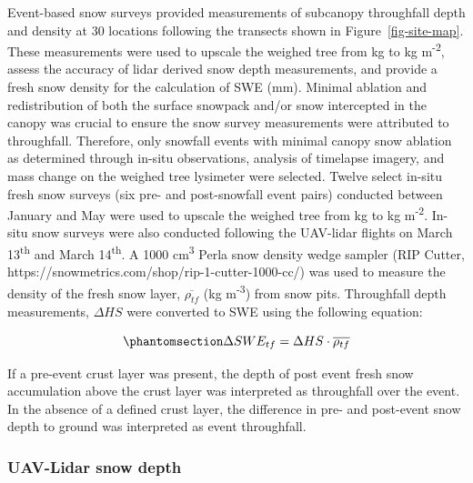 \documentclass[
  letterpaper,
  DIV=11,
  numbers=noendperiod]{scrartcl}
\begin{document}
Event-based snow surveys provided measurements of subcanopy throughfall
depth and density at 30 locations following the transects shown in
Figure~\ref{fig-site-map}. These measurements were used to upscale the
weighed tree from kg to kg m\textsuperscript{-2}, assess the accuracy of
lidar derived snow depth measurements, and provide a fresh snow density
for the calculation of SWE (mm). Minimal ablation and redistribution of
both the surface snowpack and/or snow intercepted in the canopy was
crucial to ensure the snow survey measurements were attributed to
throughfall. Therefore, only snowfall events with minimal canopy snow
ablation as determined through in-situ observations, analysis of
timelapse imagery, and mass change on the weighed tree lysimeter were
selected. Twelve select in-situ fresh snow surveys (six pre- and
post-snowfall event pairs) conducted between January and May were used
to upscale the weighed tree from kg to kg m\textsuperscript{-2}. In-situ
snow surveys were also conducted following the UAV-lidar flights on
March 13\textsuperscript{th} and March 14\textsuperscript{th}. A 1000
cm\textsuperscript{3} Perla snow density wedge sampler (RIP Cutter,
https://snowmetrics.com/shop/rip-1-cutter-1000-cc/) was used to measure
the density of the fresh snow layer, \(\overline{\rho_{tf}}\) (kg
m\textsuperscript{-3}) from snow pits. Throughfall depth measurements,
\(\Delta HS\) were converted to SWE using the following equation:

\begin{equation}\phantomsection\label{eq-swe-tf}{
\Delta SWE_{tf} = \Delta HS \cdot \overline{\rho_{tf}}
}\end{equation}

If a pre-event crust layer was present, the depth of post event fresh
snow accumulation above the crust layer was interpreted as throughfall
over the event. In the absence of a defined crust layer, the difference
in pre- and post-event snow depth to ground was interpreted as event
throughfall.

\subsubsection{UAV-Lidar snow depth}\label{uav-lidar-snow-depth}
\end{document}
